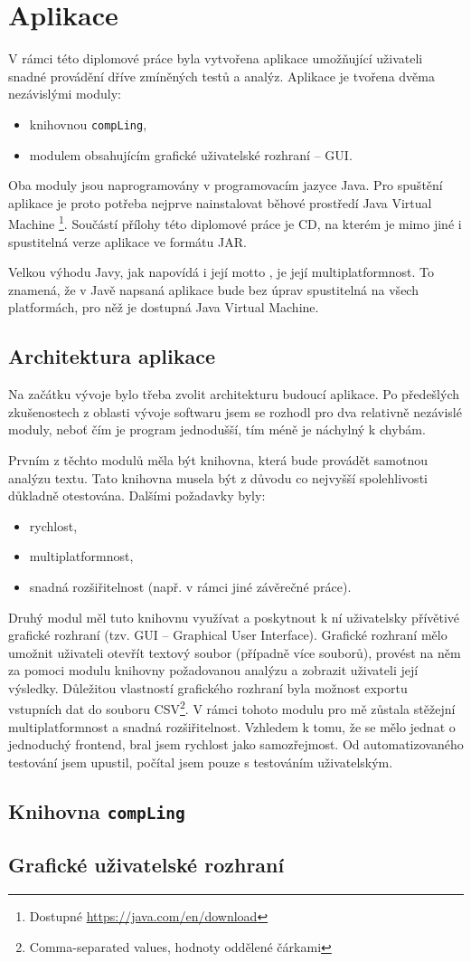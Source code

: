 \documentclass[dp.tex]{subfiles}
\begin{document}
\chapter{Aplikace}

V rámci této diplomové práce byla vytvořena aplikace umožňující uživateli snadné provádění dříve zmíněných testů a analýz. Aplikace je tvořena dvěma nezávislými moduly:
\begin{itemize}
\item knihovnou \texttt{compLing},
\item modulem obsahujícím grafické uživatelské rozhraní -- GUI.
\end{itemize}

Oba moduly jsou naprogramovány v programovacím jazyce Java. Pro spuštění aplikace je proto potřeba nejprve nainstalovat běhové prostředí Java Virtual Machine \footnote{Dostupné \url {https://java.com/en/download}}. Součástí přílohy této diplomové práce je CD, na kterém je mimo jiné i spustitelná verze aplikace ve formátu JAR.

Velkou výhodu Javy, jak napovídá i její motto , je její multiplatformnost. To znamená, že v Javě napsaná aplikace bude bez úprav spustitelná na všech platformách, pro něž je dostupná Java Virtual Machine. 

\section{Architektura aplikace}

Na začátku vývoje bylo třeba zvolit architekturu budoucí aplikace. Po předešlých zkušenostech z oblasti vývoje softwaru jsem se rozhodl pro dva relativně nezávislé moduly, neboť čím je program jednodušší, tím méně je náchylný k chybám. 

Prvním z těchto modulů měla být knihovna, která bude provádět samotnou analýzu textu. Tato knihovna musela být z důvodu co nejvyšší spolehlivosti důkladně otestována. Dalšími požadavky byly:
\begin{itemize}
\item rychlost,
\item multiplatformnost,
\item snadná rozšiřitelnost (např. v rámci jiné závěrečné práce).
\end{itemize}

Druhý modul měl tuto knihovnu využívat a poskytnout k ní uživatelsky přívětivé grafické rozhraní (tzv. GUI -- Graphical User Interface). Grafické rozhraní mělo umožnit uživateli otevřít textový soubor (případně více souborů), provést na něm za pomoci modulu knihovny požadovanou analýzu a zobrazit uživateli její výsledky. Důležitou vlastností grafického rozhraní byla možnost exportu vstupních dat do souboru CSV\footnote{Comma-separated values, hodnoty oddělené čárkami}. V rámci tohoto modulu pro mě zůstala stěžejní multiplatformnost a snadná rozšiřitelnost. Vzhledem k tomu, že se mělo jednat o jednoduchý frontend, bral jsem rychlost jako samozřejmost. Od automatizovaného testování jsem upustil, počítal jsem pouze s testováním uživatelským.

\section{Knihovna \texttt{compLing}}

\section{Grafické uživatelské rozhraní}
\end{document}
